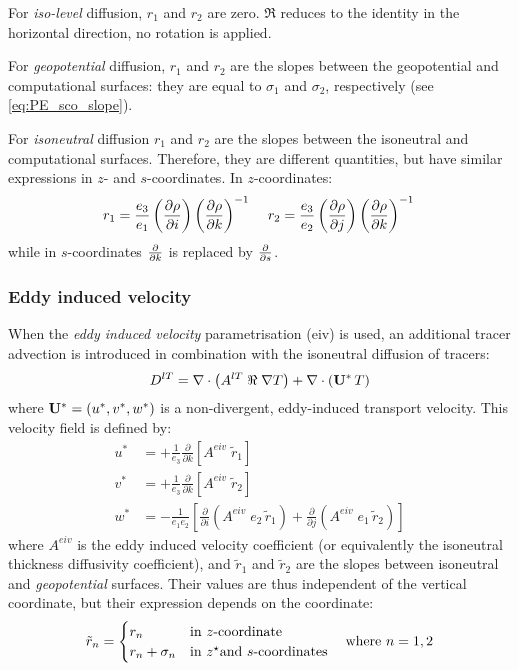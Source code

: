 \documentclass[../main/NEMO_manual]{subfiles}
\begin{document}
For \textit{iso-level} diffusion, $r_1$ and $r_2 $ are zero.
$\Re $ reduces to the identity in the horizontal direction, no rotation is applied. 

For \textit{geopotential} diffusion,
$r_1$ and $r_2 $ are the slopes between the geopotential and computational surfaces:
they are equal to $\sigma_1$ and $\sigma_2$, respectively (see \autoref{eq:PE_sco_slope}).

For \textit{isoneutral} diffusion $r_1$ and $r_2$ are the slopes between the isoneutral and computational surfaces.
Therefore, they are different quantities, but have similar expressions in $z$- and $s$-coordinates.
In $z$-coordinates:
\begin{equation}
  \label{eq:PE_iso_slopes}
  r_1 =\frac{e_3 }{e_1 }	\left( \pd[\rho]{i} \right) \left( \pd[\rho]{k} \right)^{-1} \, \quad
  r_2 =\frac{e_3 }{e_2 }	\left( \pd[\rho]{j} \right) \left( \pd[\rho]{k} \right)^{-1} \,
\end{equation}
while in $s$-coordinates $\pd[]{k}$ is replaced by $\pd[]{s}$.

\subsubsection{Eddy induced velocity}
When the \textit{eddy induced velocity} parametrisation (eiv) \citep{Gent1990} is used,
an additional tracer advection is introduced in combination with the isoneutral diffusion of tracers:
\[
  D^{lT}=\nabla \cdot \left( {A^{lT}\;\Re \;\nabla T} \right)
  +\nabla \cdot \left( {{\vect{U}}^\ast \,T} \right)
\]
where ${\vect{U}}^\ast =\left( {u^\ast ,v^\ast ,w^\ast } \right)$ is a non-divergent,
eddy-induced transport velocity. This velocity field is defined by:
\[
  \begin{split}
    u^\ast  &= +\frac{1}{e_3       }\frac{\partial }{\partial k}\left[ {A^{eiv}\;\tilde{r}_1 } \right] \\
    v^\ast  &= +\frac{1}{e_3       }\frac{\partial }{\partial k}\left[ {A^{eiv}\;\tilde{r}_2 } \right] \\
    w^\ast &=  -\frac{1}{e_1 e_2 }\left[
      \frac{\partial }{\partial i}\left( {A^{eiv}\;e_2\,\tilde{r}_1 } \right)
      +\frac{\partial }{\partial j}\left( {A^{eiv}\;e_1\,\tilde{r}_2 } \right)      \right]
  \end{split}
\]
where $A^{eiv}$ is the eddy induced velocity coefficient
(or equivalently the isoneutral thickness diffusivity coefficient),
and $\tilde{r}_1$ and $\tilde{r}_2$ are the slopes between isoneutral and \emph{geopotential} surfaces.
Their values are thus independent of the vertical coordinate, but their expression depends on the coordinate: 
\begin{align}
  \label{eq:PE_slopes_eiv}
  \tilde{r}_n =
  \begin{cases}
    r_n            &      \text{in $z$-coordinate}    \\
    r_n + \sigma_n &      \text{in \zstar and $s$-coordinates}
  \end{cases}
                     \quad \text{where } n=1,2
\end{align}
\end{document}
